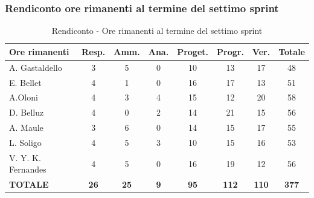 \documentclass[a4paper,12pt]{article}
\begin{document}
\subsubsection{Rendiconto ore rimanenti al termine del settimo sprint}
\begin{table}[htbp]
\centering
\renewcommand{\arraystretch}{1.5}
\begin{tabularx}{\textwidth}{|X|c|c|c|c|c|c|c|}
\hline
\textbf{Ore rimanenti} & \textbf{Resp.} & \textbf{Amm.} & \textbf{Ana.} & \textbf{Proget.} & \textbf{Progr.} & \textbf{Ver.} & \textbf{Totale} \\
\hline
A. Gastaldello & 3 & 5 & 0 & 10 & 13 & 17 & 48 \\
\hline
E. Bellet & 4 & 1 & 0 & 16 & 17 & 13 & 51 \\
\hline
A.Oloni & 4 & 3 & 4 & 15 & 12 & 20 & 58 \\
\hline
D. Belluz & 4 & 0 & 2 & 14 & 21 & 15 & 56 \\
\hline
A. Maule & 3 & 6 & 0 & 14 & 15 & 17 & 55 \\
\hline
L. Soligo & 4 & 5 & 3 & 10 & 15 & 16 & 53 \\
\hline
V. Y. K. Fernandes & 4 & 5 & 0 & 16 & 19 & 12 & 56 \\
\hline
\rowcolor{gray!20}
\textbf{TOTALE} & \textbf{26} & \textbf{25} & \textbf{9} & \textbf{95} & \textbf{112} & \textbf{110} & \textbf{377} \\
\hline
\end{tabularx}
\caption{Rendiconto - Ore rimanenti al termine del settimo sprint}
\end{table}
\end{document}

